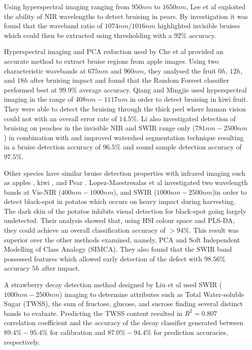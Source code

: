 \documentclass[fleqn,twoside,12pt]{report}
\begin{document}
Using hyperspectral imaging ranging from $950nm$ to $1650nm$, Lee et al \cite{lee} exploited the ability of NIR wavelengths to detect bruising in pears. By investigation it was found that the waveband ratio of $1074nm/1016nm$ highlighted invisible bruises which could then be extracted using thresholding with a $92\%$ accuracy. 

Hyperspectral imaging and PCA reduction used by Che et al \cite{che} provided an accurate method to extract bruise regions from apple images. Using two characteristic wavebands at $675nm$ and $960 nm$, they analysed the fruit $0h$, $12h$, and $18h$ after bruising impact and found that the Random Forrest classifier performed best at $99.9\%$ average accuracy. Qiang and Mingjie \cite{qiang} used hyperspectral imaging  in the range of $408nm-1117nm$ in order to detect bruising in kiwi fruit. They were able to detect the bruising through the thick peel where human vision could not with an overall error rate of $14.5\%$. Li \cite{li3} also investigated detection of bruising on peaches in the invisible NIR and SWIR range only ($781nm-2500nm$) in combination with and improved watershed segmentation technique resulting in a bruise detection accuracy of $96.5\%$ and sound sample detection accuracy of $97.5\%$.

Other species have similar bruise detection properties with infrared imaging such as apples \cite{che}, kiwi \cite{qiang}, and Pear \cite{lee}. Lopez-Maestresalas et al \cite{ainara} investigated two wavelength bands at Vis-NIR ($400nm-1000nm$), and SWIR ($1000nm-2500nm$)in order to detect black-spot in potatos which occurs on heavy impact during harvesting. The dark skin of the potatos inhibits visual detection for black-spot going largely undetected. Their analysis showed that, using HSI colour space and PLS-DA, they could achieve an overall classification accuracy of $>94\%$. This result was superior over the other methods examined, namely, PCA and Soft Independent Modelling of Class Analogy (SIMCA). They also found that the SWIR band possessed features which allowed early detection of the defect with $98.56\%$ accuracy $5h$ after impact.

A strawberry decay detection method designed by Liu et al \cite{liu2} used SWIR ($1000nm-2500nm$) imaging to determine attributes such as Total Water-soluble Sugar (TWSS), the sum of fructose, glucose, and sucrose finding several distinct bands to evaluate. Predicting the TWSS content resulted in $R^2=0.807$ correlation coefficient and the accuracy of the decay classifier generated between $89.4\%-95.4\%$ for calibration and $87.0\%-94.4\%$ for prediction accuracies, respectively.
\end{document}
